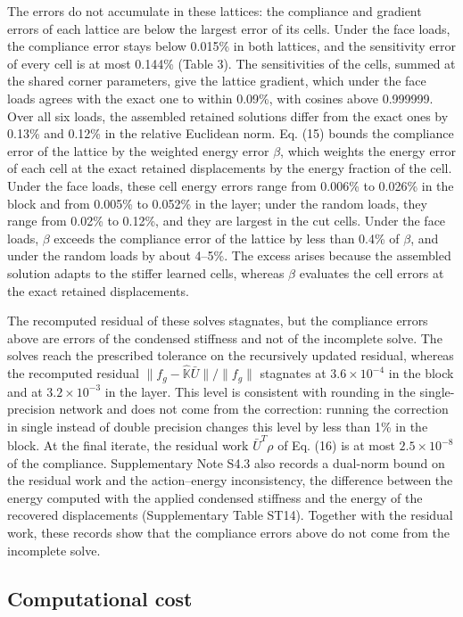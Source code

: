 \documentclass[preprint,12pt,authoryear]{elsarticle}
\begin{document}
The errors do not accumulate in these lattices: the compliance and gradient errors of each lattice are below the largest error of its cells. Under the face loads, the compliance error stays below 0.015\% in both lattices, and the sensitivity error of every cell is at most 0.144\% (Table 3). The sensitivities of the cells, summed at the shared corner parameters, give the lattice gradient, which under the face loads agrees with the exact one to within 0.09\%, with cosines above 0.999999. Over all six loads, the assembled retained solutions differ from the exact ones by 0.13\% and 0.12\% in the relative Euclidean norm. Eq. (15) bounds the compliance error of the lattice by the weighted energy error \(\beta\), which weights the energy error of each cell at the exact retained displacements by the energy fraction of the cell. Under the face loads, these cell energy errors range from 0.006\% to 0.026\% in the block and from 0.005\% to 0.052\% in the layer; under the random loads, they range from 0.02\% to 0.12\%, and they are largest in the cut cells. Under the face loads, \(\beta\) exceeds the compliance error of the lattice by less than 0.4\% of \(\beta\), and under the random loads by about 4--5\%. The excess arises because the assembled solution adapts to the stiffer learned cells, whereas \(\beta\) evaluates the cell errors at the exact retained displacements.

The recomputed residual of these solves stagnates, but the compliance errors above are errors of the condensed stiffness and not of the incomplete solve. The solves reach the prescribed tolerance on the recursively updated residual, whereas the recomputed residual \(\|f_g-\widehat{\mathbb K}\bar U\|/\|f_g\|\) stagnates at \(3.6\times10^{-4}\) in the block and at \(3.2\times10^{-3}\) in the layer. This level is consistent with rounding in the single-precision network and does not come from the correction: running the correction in single instead of double precision changes this level by less than 1\% in the block. At the final iterate, the residual work \(\bar U^T\rho\) of Eq. (16) is at most \(2.5\times10^{-8}\) of the compliance. Supplementary Note S4.3 also records a dual-norm bound on the residual work and the action--energy inconsistency, the difference between the energy computed with the applied condensed stiffness and the energy of the recovered displacements (Supplementary Table ST14). Together with the residual work, these records show that the compliance errors above do not come from the incomplete solve.

\subsection{Computational cost}
\end{document}
